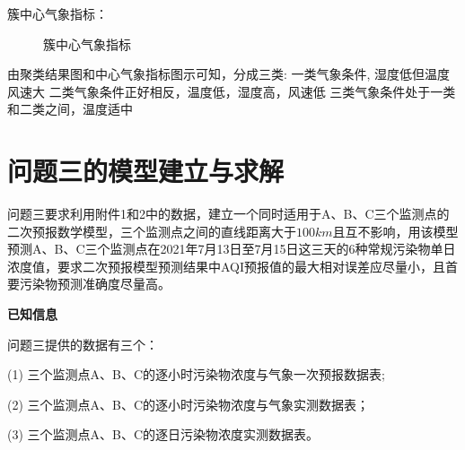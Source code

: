 \documentclass[a4paper,10pt]{my_paper}
\numberwithin{equation}{section}
\begin{document}
簇中心气象指标：
\begin{figure}[h!]
  \caption{簇中心气象指标}\label{簇中心气象指标}
\end{figure}

由聚类结果图和中心气象指标图示可知，分成三类:
一类气象条件, 湿度低但温度风速大
二类气象条件正好相反，温度低，湿度高，风速低
三类气象条件处于一类和二类之间，温度适中

\section{问题三的模型建立与求解}
问题三要求利用附件1和2中的数据，建立一个同时适用于A、B、C三个监测点的二次预报数学模型，三个监测点之间的直线距离大于${100km}$且互不影响，用该模型预测A、B、C三个监测点在2021年7月13日至7月15日这三天的6种常规污染物单日浓度值，要求二次预报模型预测结果中AQI预报值的最大相对误差应尽量小，且首要污染物预测准确度尽量高。

\textbf{已知信息}

问题三提供的数据有三个：

(1) 三个监测点A、B、C的逐小时污染物浓度与气象一次预报数据表;

(2) 三个监测点A、B、C的逐小时污染物浓度与气象实测数据表；

(3) 三个监测点A、B、C的逐日污染物浓度实测数据表。


\end{document}
